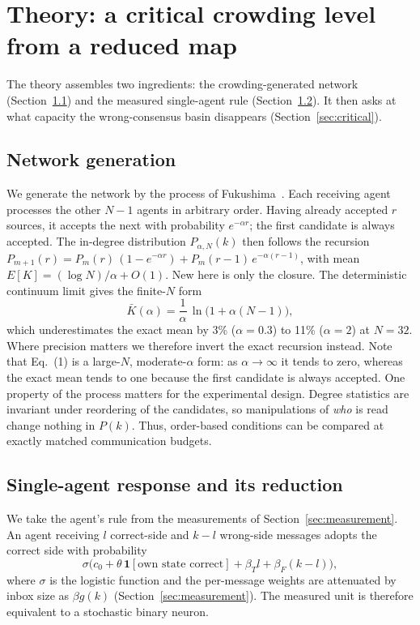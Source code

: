 \documentclass{ieeeaccess}
\begin{document}
\section{Theory: a critical crowding level from a reduced map}\label{sec:theory}

The theory assembles two ingredients: the crowding-generated network
(Section~\ref{sec:netgen}) and the measured single-agent rule
(Section~\ref{sec:reduction}). It then asks at what capacity the
wrong-consensus basin disappears (Section~\ref{sec:critical}).

\subsection{Network generation}\label{sec:netgen}

We generate the network by the process of Fukushima~\cite{SciRepCrowding}. Each
receiving agent processes the other $N-1$ agents in arbitrary order. Having
already accepted $r$ sources, it accepts the next with probability
$e^{-\alpha r}$; the first candidate is always accepted. The in-degree
distribution $P_{\alpha,N}(k)$ then follows the recursion
$P_{m+1}(r) = P_m(r)\,(1-e^{-\alpha r}) + P_m(r-1)\,e^{-\alpha (r-1)}$,
with mean $E[K] = (\log N)/\alpha + O(1)$. New here is only the closure.
The deterministic continuum limit gives the finite-$N$ form
\begin{equation}
\bar K(\alpha) = \frac{1}{\alpha}\,\ln\!\bigl(1 + \alpha (N-1)\bigr),
\end{equation}
which underestimates the exact mean by 3\% ($\alpha = 0.3$) to 11\%
($\alpha = 2$) at $N = 32$. Where precision matters we therefore invert the
exact recursion instead. Note that Eq.~(1) is a large-$N$,
moderate-$\alpha$ form: as $\alpha \to \infty$ it tends to zero, whereas
the exact mean tends to one because the first candidate is always accepted.
One property of the process matters for the experimental design. Degree
statistics are invariant under reordering of the candidates, so
manipulations of \emph{who} is read change nothing in $P(k)$. Thus,
order-based conditions can be compared at exactly matched communication
budgets.

\subsection{Single-agent response and its reduction}\label{sec:reduction}

We take the agent's rule from the measurements of
Section~\ref{sec:measurement}. An agent receiving $l$ correct-side and
$k-l$ wrong-side messages adopts the correct side with probability
\[
\sigma\bigl(c_0 + \theta\,\mathbf{1}[\text{own state correct}] + \beta_T l +
\beta_F (k-l)\bigr),
\]
where $\sigma$ is the logistic function and the
per-message weights are attenuated by inbox size as $\beta g(k)$
(Section~\ref{sec:measurement}). The measured unit is therefore equivalent
to a stochastic binary neuron.
\end{document}

